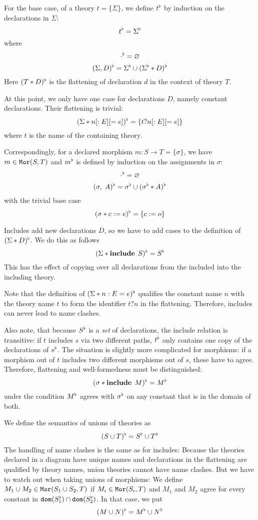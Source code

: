 For the base case, of a theory $t=\{\Sigma\}$, we define $t^\flat$ by induction on the declarations in $\Sigma$:
\[t^\flat=\Sigma^\flat\]
where
 \[\cdot^\flat=\varnothing\]
 \[(\Sigma,D)^\flat=\Sigma^\flat\cup(\Sigma^\flat\ast D)^\flat\]
Here $(T\ast D)^\flat$ is the flattening of declaration $d$ in the context of theory $T$.

At this point, we only have one case for declarations $D$, namely constant declarations.
Their flattening is trivial:
 \[(\Sigma\ast n[:E][=e])^\flat=\{t?n[:E][=e]\}\]
where $t$ is the name of the containing theory.

Correspondingly, for a declared morphism $m:S\to T=\{\sigma\}$, we have $m\in\mathtt{Mor}(S,T)$ and $m^\flat$ is defined by induction on the assignments in $\sigma$:
 \[\cdot^\flat=\varnothing\]
 \[(\sigma,\;A)^\flat=\sigma^\flat\cup(\sigma^\flat\ast A)^\flat\]
with the trivial base case
 \[(\sigma\ast c:=e)^\flat=\{c:=o\}\]

\begin{example}\label{sem:incl}
Includes add new declarations $D$, so we have to add cases to the definition of $(\Sigma\ast D)^\flat$.
We do this as follows
  \[(\Sigma\ast \operatorname{\mathbf{include}}{\;S})^\flat = S^\flat\]
This has the effect of copying over all declarations from the included into the including theory.

Note that the definition of $(\Sigma\ast n:E=e)^\flat$ qualifies the constant name $n$ with the theory name $t$ to form the identifier $t?n$ in the flattening.
Therefore, includes can never lead to name clashes.

Also note, that because $S^\flat$ is a \textit{set} of declarations, the include relation is transitive: if $t$ includes $s$ via two different paths, $t^\flat$ only contains one copy of the declarations of $s^\flat$.
The situation is slightly more complicated for morphisms: if a morphism out of $t$ includes two different morphisms out of $s$, these have to agree.
Therefore, flattening and well-formedness must be distinguished:
  \[(\sigma\ast \operatorname{\mathbf{include}}{\;M})^\flat = M^\flat\]
under the condition $M^\flat$ agrees with $\sigma^\flat$ on any constant that is in the domain of both.
\end{example}

\begin{example}\label{sem:union}
We define the semantics of unions of theories as
\[(S\cup T)^\flat=S^\flat\cup T^\flat\]
The handling of name clashes is the same as for includes:
Because the theories declared in a diagram have unique names and declarations in the flattening are qualified by theory names, union theories cannot have name clashes.
But we have to watch out when taking unions of morphisms:
We define $M_1\cup M_2\in \mathtt{Mor}(S_1\cup S_2,T)$ if $M_i\in\mathtt{Mor}(S_i,T)$ and $M_1$ and $M_2$ agree for every constant in $\mathtt{dom}(S_1^\flat)\cap\mathtt{dom}(S_2^\flat)$.
In that case, we put
\[(M\cup N)^\flat=M^\flat\cup N^\flat\]
\end{example}

